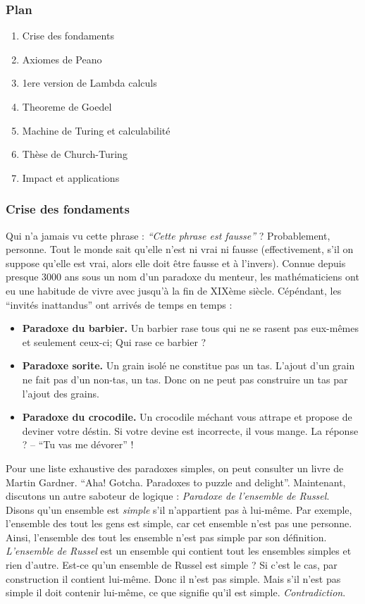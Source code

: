 \documentclass[12pt, a4paper]{article}
\begin{document}
\subsubsection*{Plan}
\begin{enumerate}
	\item Crise des fondaments
	\item Axiomes de Peano
	\item 1ere version de Lambda calculs
	\item Theoreme de Goedel
	\item Machine de Turing et calculabilité
	\item Thèse de Church-Turing
	\item Impact et applications
\end{enumerate}


\subsubsection*{Crise des fondaments}
Qui n'a jamais vu cette phrase : \emph{``Cette phrase est fausse''} ?
Probablement, personne.
Tout le monde sait qu'elle n'est ni vrai ni fausse (effectivement, s'il on suppose qu'elle est vrai, alors elle doit être fausse et à l'invers).
Connue depuis presque 3000 ans sous un nom d'un paradoxe du menteur, les mathématiciens ont eu une habitude de vivre avec jusqu'à la fin de XIXème siècle.
Cépéndant, les ``invités inattandus'' ont arrivés de temps en temps :
\begin{itemize}
	\item \textbf{Paradoxe du barbier.}
		Un barbier rase tous qui ne se rasent pas eux-mêmes et seulement ceux-ci; Qui rase ce barbier ?
	\item \textbf{Paradoxe sorite.}
		Un grain isolé ne constitue pas un tas.
		L'ajout d'un grain ne fait pas d'un non-tas, un tas.
		Donc on ne peut pas construire un tas par l'ajout des grains.
	\item \textbf{Paradoxe du crocodile.}
		Un crocodile méchant vous attrape et propose de deviner votre déstin.
		Si votre devine est incorrecte, il vous mange.
		La réponse ? -- ``Tu vas me dévorer'' !
\end{itemize}

Pour une liste exhaustive des paradoxes simples, on peut consulter un livre de Martin Gardner. ``Aha! Gotcha. Paradoxes to puzzle and delight''.
Maintenant, discutons un autre saboteur de logique : \emph{Paradoxe de l'ensemble de Russel}.
Disons qu'un ensemble est \emph{simple} s'il n'appartient pas à lui-même. Par exemple, l'ensemble des tout les gens est simple, car cet ensemble n'est pas une personne. Ainsi, l'ensemble des tout les ensemble n'est pas simple par son définition. \emph{L'ensemble de Russel} est un ensemble qui contient tout les ensembles simples et rien d'autre.
Est-ce qu'un ensemble de Russel est simple ? Si c'est le cas, par construction il contient lui-même. Donc il n'est pas simple. Mais s'il n'est pas simple il doit contenir lui-même, ce que signifie qu'il est simple. \emph{Contradiction}.
\end{document}
